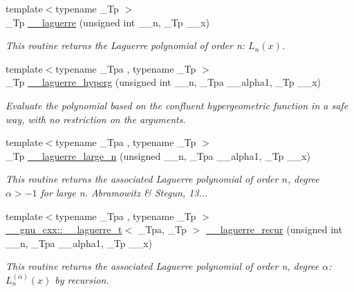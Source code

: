\begin{DoxyCompactItemize}
{\footnotesize template$<$typename \+\_\+\+Tp $>$ }\\\+\_\+\+Tp \hyperlink{namespacestd_1_1____detail_aa714c4983a3cb7d9d18e0c2c5a8f6826}{\+\_\+\+\_\+laguerre} (unsigned int \+\_\+\+\_\+n, \+\_\+\+Tp \+\_\+\+\_\+x)
\begin{DoxyCompactList}\small\item\em This routine returns the Laguerre polynomial of order n\+: $ L_n(x) $. \end{DoxyCompactList}\item 
{\footnotesize template$<$typename \+\_\+\+Tpa , typename \+\_\+\+Tp $>$ }\\\+\_\+\+Tp \hyperlink{namespacestd_1_1____detail_a7908be328a4546d77802076196ae4396}{\+\_\+\+\_\+laguerre\+\_\+hyperg} (unsigned int \+\_\+\+\_\+n, \+\_\+\+Tpa \+\_\+\+\_\+alpha1, \+\_\+\+Tp \+\_\+\+\_\+x)
\begin{DoxyCompactList}\small\item\em Evaluate the polynomial based on the confluent hypergeometric function in a safe way, with no restriction on the arguments. \end{DoxyCompactList}\item 
{\footnotesize template$<$typename \+\_\+\+Tpa , typename \+\_\+\+Tp $>$ }\\\+\_\+\+Tp \hyperlink{namespacestd_1_1____detail_abfce1c88345c266f5bcc9831766ed760}{\+\_\+\+\_\+laguerre\+\_\+large\+\_\+n} (unsigned \+\_\+\+\_\+n, \+\_\+\+Tpa \+\_\+\+\_\+alpha1, \+\_\+\+Tp \+\_\+\+\_\+x)
\begin{DoxyCompactList}\small\item\em This routine returns the associated Laguerre polynomial of order $ n $, degree $ \alpha > -1 $ for large n. Abramowitz \& Stegun, 13... \end{DoxyCompactList}\item 
{\footnotesize template$<$typename \+\_\+\+Tpa , typename \+\_\+\+Tp $>$ }\\\hyperlink{struct____gnu__cxx_1_1____laguerre__t}{\+\_\+\+\_\+gnu\+\_\+cxx\+::\+\_\+\+\_\+laguerre\+\_\+t}$<$ \+\_\+\+Tpa, \+\_\+\+Tp $>$ \hyperlink{namespacestd_1_1____detail_ab5344b00cf4ed8b39c9132ce0b9287af}{\+\_\+\+\_\+laguerre\+\_\+recur} (unsigned int \+\_\+\+\_\+n, \+\_\+\+Tpa \+\_\+\+\_\+alpha1, \+\_\+\+Tp \+\_\+\+\_\+x)
\begin{DoxyCompactList}\small\item\em This routine returns the associated Laguerre polynomial of order {\ttfamily n}, degree {\ttfamily $ \alpha $}\+: $ L_n^{(\alpha)}(x) $ by recursion. \end{DoxyCompactList}\item 

\end{DoxyCompactItemize}

